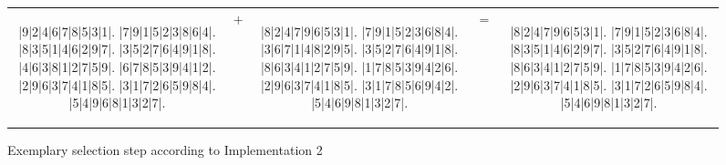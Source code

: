 \begin{figure}[H]
  \centering
  {\setlength{\tabcolsep}{-9pt}
  \renewcommand{\arraystretch}{1.5}
   \begin{tabular}{c c c c c}
    \begin{adjustbox}{width=0.38\textwidth,valign=c}
      \begin{minipage}{\linewidth}
        \begin{sudoku}
          |9|2|4|6|7|8|5|3|1|.
          |7|9|1|5|2|3|8|6|4|.
          |8|3|5|1|4|6|2|9|7|.
          |3|5|2|7|6|4|9|1|8|.
          |4|6|3|8|1|2|7|5|9|.
          |6|7|8|5|3|9|4|1|2|.
          |2|9|6|3|7|4|1|8|5|.
          |3|1|7|2|6|5|9|8|4|.
          |5|4|9|6|8|1|3|2|7|.
        \end{sudoku}
      \end{minipage}
    \end{adjustbox}
    & %
    {\begin{adjustbox}{valign=c}\Large$+$\end{adjustbox}}
    &
    \begin{adjustbox}{width=0.38\textwidth,valign=c}
      \begin{minipage}{\linewidth}
        \begin{sudoku}
          |8|2|4|7|9|6|5|3|1|.
          |7|9|1|5|2|3|6|8|4|.
          |3|6|7|1|4|8|2|9|5|.
          |3|5|2|7|6|4|9|1|8|.
          |8|6|3|4|1|2|7|5|9|.
          |1|7|8|5|3|9|4|2|6|.
          |2|9|6|3|7|4|1|8|5|.
          |3|1|7|8|5|6|9|4|2|.
          |5|4|6|9|8|1|3|2|7|.
        \end{sudoku}
      \end{minipage}
    \end{adjustbox}
    & %
    {\begin{adjustbox}{valign=c}\Large$=$\end{adjustbox}}
    &
    \begin{adjustbox}{width=0.38\textwidth,valign=c}
      \begin{minipage}{\linewidth}
        \begin{sudoku}
          |8|2|4|7|9|6|5|3|1|.
          |7|9|1|5|2|3|6|8|4|.
          |8|3|5|1|4|6|2|9|7|.
          |3|5|2|7|6|4|9|1|8|.
          |8|6|3|4|1|2|7|5|9|.
          |1|7|8|5|3|9|4|2|6|.
          |2|9|6|3|7|4|1|8|5|.
          |3|1|7|2|6|5|9|8|4|.
          |5|4|6|9|8|1|3|2|7|.
        \end{sudoku}
      \end{minipage}
    \end{adjustbox}
   \end{tabular}
  }
  \caption{Exemplary selection step according to Implementation 2}
  \label{fig:impl-2-selection}
\end{figure}


